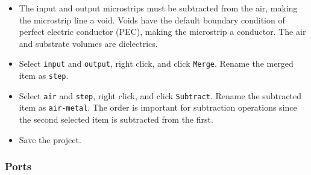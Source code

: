 \documentclass[titlepage]{article}
\renewcommand\_{\textunderscore\linebreak[1]}
\begin{document}
\begin{itemize}
\begin{figure}[H]
  \caption{Substrate, input and output microstrips, and air.}
  \label{fig:step_pieces}
\end{figure}
\item The input and output microstrips must be subtracted from the air, making the microstrip line a void.  Voids have the default boundary condition of perfect electric conductor (PEC), making the microstrip a conductor.  The air and substrate volumes are dielectrics.
\item Select \texttt{input} and \texttt{output}, right click, and click \texttt{Merge}.  Rename the merged item as \texttt{step}.
\item Select \texttt{air} and \texttt{step}, right click, and click \texttt{Subtract}.  Rename the subtracted item as \texttt{air-metal}.  The order is important for subtraction operations since the second selected item is subtracted from the first.
\item Save the project.
\end{itemize}

\subsubsection{Ports}
\end{document}
